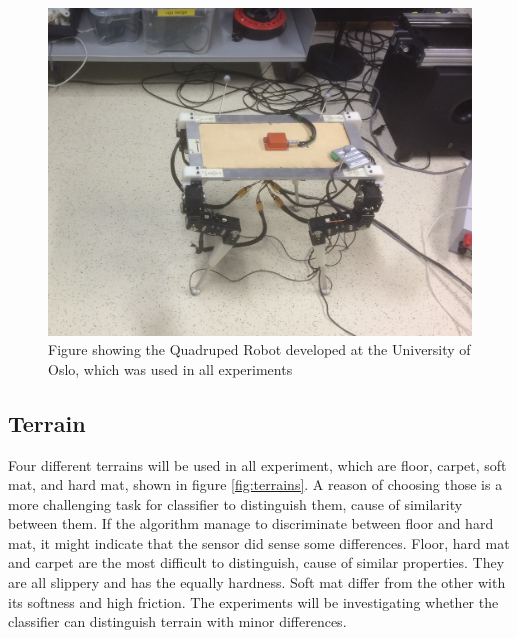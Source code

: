 \documentclass[USenglish]{ifimaster}  %
\begin{document}
\begin{figure}[h]
    \centering
    \includegraphics[width=\textwidth,height=\textheight,keepaspectratio]{Figures/Robot3}
    \caption{Figure showing the Quadruped Robot developed at the University of Oslo, which was used in all experiments}
    \label{fig:robot}
\end{figure}
\FloatBarrier

\subsection{Terrain} \label{seq:terrain}
Four different terrains will be used in all experiment, which are floor, carpet, soft mat, and hard mat, shown in figure \ref{fig:terrains}. A reason of choosing those is a more challenging task for classifier to distinguish them, cause of similarity between them. If the algorithm manage to discriminate between floor and hard mat, it might indicate that the sensor did sense some differences.  Floor, hard mat and carpet are the most difficult to distinguish, cause of similar properties. They are all slippery and has the equally hardness. Soft mat differ from the other with its softness and high friction. The experiments will be investigating whether the classifier can distinguish terrain with minor differences.
\end{document}

